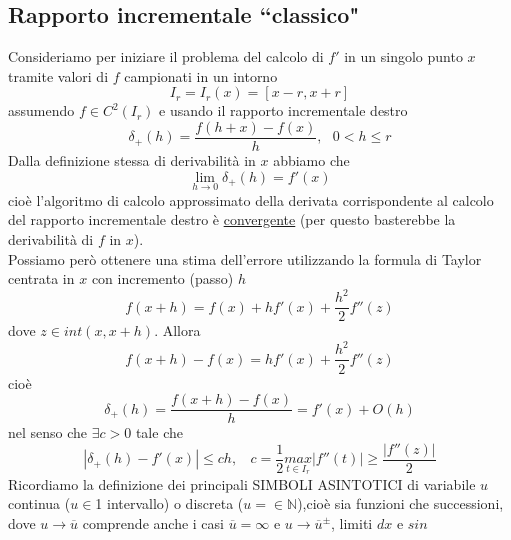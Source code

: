 \documentclass[12pt,a4paper]{article}
\begin{document}
\subsection{Rapporto incrementale ``classico"}
Consideriamo per iniziare il problema del calcolo di $f'$ in un singolo punto $x$ tramite valori di $f$ campionati in un intorno 
\begin{equation*}
    I_r=I_r(x)=[x-r,x+r]
\end{equation*}
assumendo $f\in C^2(I_r)$ e usando
il rapporto incrementale destro 
\begin{equation*}
    \delta_+(h)=\frac{f(h+x)-f(x)}{h},\  \  \  0<h\leq r
\end{equation*}
Dalla definizione stessa di derivabilità in $x$ abbiamo che
\begin{equation*}
    \underset{h\rightarrow0}{\lim}\delta_+(h)=f'(x)
\end{equation*}
cioè l'algoritmo di calcolo approssimato della derivata corrispondente al calcolo del rapporto incrementale destro è \uline{convergente} (per questo basterebbe la derivabilità di $f$ in $x$).\\Possiamo però ottenere una
stima dell'errore utilizzando la formula di Taylor centrata in $x$ con incremento (passo) $h$
\begin{equation*}
    f(x+h)=f(x)+hf'(x)+\frac{h^2}{2}f''(z)
\end{equation*}
dove $z\in int(x,x+h)$. Allora
\begin{equation*}
    f(x+h)-f(x)=hf'(x)+\frac{h^2}{2}f''(z)
\end{equation*}
cioè
\begin{equation*}
    \delta_+(h)=\frac{f(x+h)-f(x)}{h}=f'(x)+O(h)
\end{equation*}
nel senso che $\exists c>0$ tale che 
\begin{equation*}
    |\delta_+(h)-f'(x)|\leq ch,\  \  \  \  c=\frac{1}{2}\underset{t\in I_r}{max}|f''(t)|\geq\frac{|f''(z)|}{2}
\end{equation*}
Ricordiamo la definizione dei principali SIMBOLI ASINTOTICI di variabile $u$ continua ($u\in$1 intervallo) o discreta ($u=\in \mathbb{N}$),cioè sia funzioni che successioni, dove $u \rightarrow \overline{u}$ comprende anche i casi $\overline{u}=\infty$ e $u \rightarrow \overline{u}^{\pm}$, limiti $dx$ e $sin$
\end{document}
